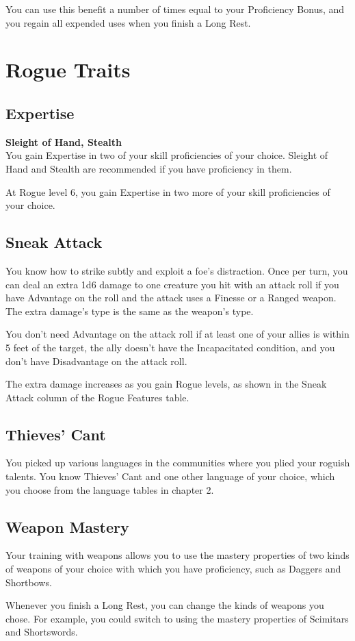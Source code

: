 \documentclass[letterpaper,openany,oneside,twocolumn]{book}
\begin{document}
You can use this benefit a number of times equal to your Proficiency Bonus, and you regain all expended uses when you finish a Long Rest.

\section*{Rogue Traits}
\subsection*{Expertise}
\textbf{Sleight of Hand, Stealth}\\
You gain Expertise in two of your skill proficiencies of your choice. Sleight of Hand and Stealth are recommended if you have proficiency in them.

At Rogue level 6, you gain Expertise in two more of your skill proficiencies of your choice.
\subsection*{Sneak Attack}
You know how to strike subtly and exploit a foe's distraction. Once per turn, you can deal an extra 1d6 damage to one creature you hit with an attack roll if you have Advantage on the roll and the attack uses a Finesse or a Ranged weapon. The extra damage's type is the same as the weapon's type.

You don't need Advantage on the attack roll if at least one of your allies is within 5 feet of the target, the ally doesn't have the Incapacitated condition, and you don't have Disadvantage on the attack roll.

The extra damage increases as you gain Rogue levels, as shown in the Sneak Attack column of the Rogue Features table.
\subsection*{Thieves' Cant}
You picked up various languages in the communities where you plied your roguish talents. You know Thieves' Cant and one other language of your choice, which you choose from the language tables in chapter 2.
\subsection*{Weapon Mastery}
Your training with weapons allows you to use the mastery properties of two kinds of weapons of your choice with which you have proficiency, such as Daggers and Shortbows.

Whenever you finish a Long Rest, you can change the kinds of weapons you chose. For example, you could switch to using the mastery properties of Scimitars and Shortswords.
\end{document}
